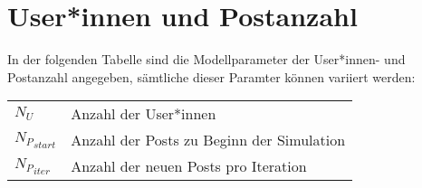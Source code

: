 




\section{User*innen und Postanzahl}

In der folgenden Tabelle sind die Modellparameter der User*innen- und Postanzahl angegeben, sämtliche dieser Paramter können variiert werden:

\begin{table}[!htbp]
	\begin{tabularx}{\textwidth}{lX}
		$N_U$&  Anzahl der User*innen\\
		${N_P}_{start}$ & Anzahl der Posts zu Beginn der Simulation \\
		${N_P}_{iter}$ & Anzahl der neuen Posts pro Iteration\\ 
	\end{tabularx}
\end{table}
